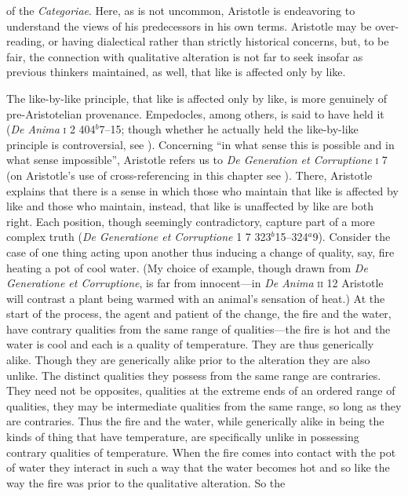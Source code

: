 of the \emph{Categoriae}. Here, as is not uncommon, Aristotle is endeavoring to understand the views of his predecessors in his own terms. Aristotle may be over-reading, or having dialectical rather than strictly historical concerns, but, to be fair, the connection with qualitative alteration is not far to seek insofar as previous thinkers maintained, as well, that like is affected only by like.

The like-by-like principle, that like is affected only by like, is more genuinely of pre-Aristotelian provenance. Empedocles, among others, is said to have held it (\emph{De Anima} \textsc{i} 2 404\( ^{b} \)7--15; though whether he actually held the like-by-like principle is controversial, see \citealt{Kamtekar:2009fk}). Concerning ``in what sense this is possible and in what sense impossible'', Aristotle refers us to \emph{De Generation et Corruptione} \textsc{i} 7 (on Aristotle's use of cross-referencing in this chapter see \citealt{Burnyeat:2002an}). There, Aristotle explains that there is a sense in which those who maintain that like is affected by like and those who maintain, instead, that like is unaffected by like are both right. Each position, though seemingly contradictory, capture part of a more complex truth (\emph{De Generatione et Corruptione} \textsc{1} 7 323\( ^{b} \)15--324\( ^{a} \)9). Consider the case of one thing acting upon another thus inducing a change of quality, say, fire heating a pot of cool water. (My choice of example, though drawn from \emph{De Generatione et Corruptione}, is far from innocent---in \emph{De Anima} \textsc{ii} 12 Aristotle will contrast a plant being warmed with an animal's sensation of heat.) At the start of the process, the agent and patient of the change, the fire and the water, have contrary qualities from the same range of qualities---the fire is hot and the water is cool and each is a quality of temperature. They are thus generically alike. Though they are generically alike prior to the alteration they are also unlike. The distinct qualities they possess from the same range are contraries. They need not be opposites, qualities at the extreme ends of an ordered range of qualities, they may be intermediate qualities from the same range, so long as they are contraries. Thus the fire and the water, while generically alike in being the kinds of thing that have temperature, are specifically unlike in possessing contrary qualities of temperature. When the fire comes into contact with the pot of water they interact in such a way that the water becomes hot and so like the way the fire was prior to the qualitative alteration. So the 